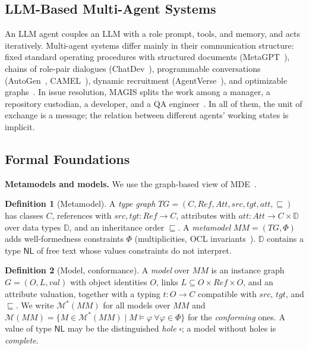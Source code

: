\documentclass[10pt, anonymous, conference]{IEEEtran}
\theoremstyle{definition}
\newtheorem{definition}{Definition}[section]
\theoremstyle{plain}
\theoremstyle{remark}
\newcommand{\MM}{\mathit{MM}}
\newcommand{\Mods}[1]{\mathcal{M}(#1)}
\newcommand{\AllMods}[1]{\mathcal{M}^{\ast}(#1)}
\newcommand{\NL}{\mathsf{NL}}
\begin{document}
\subsection{LLM-Based Multi-Agent Systems} \label{subsec:mas}
An LLM agent couples an LLM with a role prompt, tools, and memory, and acts
iteratively. Multi-agent systems differ mainly in their communication
structure: fixed standard operating procedures with structured documents
(MetaGPT~\cite{hong2024metagpt}), chains of role-pair dialogues
(ChatDev~\cite{qian2024chatdev}), programmable conversations
(AutoGen~\cite{wu2024autogen}, CAMEL~\cite{li2023camel}), dynamic recruitment
(AgentVerse~\cite{chen2024agentverse}), and optimizable
graphs~\cite{zhuge2024gptswarm,hu2025adas,zhang2025aflow}. In issue
resolution, MAGIS splits the work among a manager, a repository custodian, a
developer, and a QA engineer~\cite{tao2024magis}. In all of them, the unit of
exchange is a message; the relation between different agents' working states
is implicit.

\subsection{Formal Foundations} \label{subsec:formal}

\noindent\textbf{Metamodels and models.} We use the graph-based view of
MDE~\cite{ehrig2006fundamentals}.

\begin{definition}[Metamodel]\label{def:mm}
A \emph{type graph} $\mathit{TG}=(C,\mathit{Ref},\mathit{Att},
\mathit{src},\mathit{tgt},\mathit{att},\sqsubseteq)$ has classes $C$,
references with $\mathit{src},\mathit{tgt}\colon\mathit{Ref}\to C$,
attributes with $\mathit{att}\colon\mathit{Att}\to C\times\mathbb{D}$ over data
types $\mathbb{D}$, and an inheritance order ${\sqsubseteq}$. A
\emph{metamodel} $\MM=(\mathit{TG},\Phi)$ adds well-formedness constraints
$\Phi$ (multiplicities, OCL invariants~\cite{omg2014ocl}). $\mathbb{D}$
contains a type $\NL$ of free text whose values constraints do not interpret.
\end{definition}

\begin{definition}[Model, conformance]\label{def:model}
A \emph{model} over $\MM$ is an instance graph $G=(O,L,\mathit{val})$ with
object identities $O$, links $L\subseteq O\times\mathit{Ref}\times O$, and an
attribute valuation, together with a typing $t\colon O\to C$ compatible with
$\mathit{src}$, $\mathit{tgt}$, and ${\sqsubseteq}$. We write
$\AllMods{\MM}$ for all models over $\MM$ and
$\Mods{\MM}=\{M\in\AllMods{\MM}\mid M\models\varphi\ \forall\varphi\in\Phi\}$
for the \emph{conforming} ones. A value of type $\NL$ may be the distinguished
\emph{hole} $\square$; a model without holes is \emph{complete}.
\end{definition}
\end{document}
